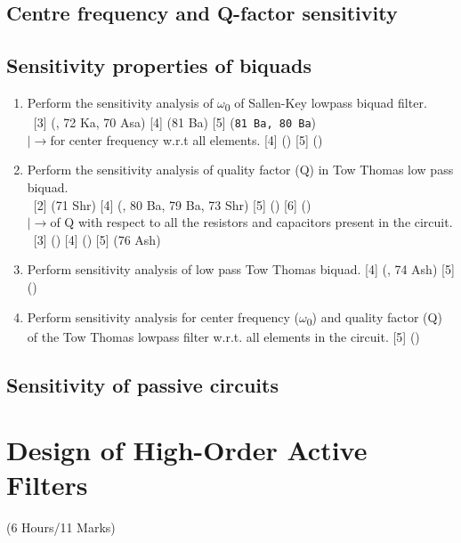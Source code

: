 \documentclass[12pt]{article}
\newcommand{\w}{\(\omega\)}
\newcommand{\lb}{\\$\left|\rightarrow\right.$}
\newcommand{\enter}{\\\textcolor{white}{1}}
\newcommand{\sub}[1]{\textsubscript{#1}}
\begin{document}
	\subsection{Centre frequency and Q-factor sensitivity}
	\subsection{Sensitivity properties of biquads}
		\begin{enumerate}
			\item Perform the sensitivity analysis of \w\sub{0} of Sallen-Key lowpass biquad filter.
			\enter\hfill [3] {\footnotesize (, 72 Ka, 70 Asa)} [4] {\footnotesize (81 Ba) } [5] {\footnotesize (\texttt{81 Ba, 80 Ba})}
			\lb for center frequency w.r.t all elements. \hfill [4] {\footnotesize ()} [5] {\footnotesize ()}

			\item Perform the sensitivity analysis of quality factor (Q) in Tow Thomas low pass biquad.
			\enter\hfill [2] {\footnotesize (71 Shr)} [4] {\footnotesize (, 80 Ba, 79 Ba, 73 Shr)} [5] {\footnotesize ()} [6] {\footnotesize ()}
			\lb of Q with respect to all the resistors and capacitors present in the circuit. 
			\enter\hfill[3] () [4] () [5] (76 Ash)

			\item Perform sensitivity analysis of low pass Tow Thomas biquad. \hfill [4] (, 74 Ash) [5] ()

			\item Perform sensitivity analysis for center frequency (\w\sub{0}) and quality factor (Q) of the Tow Thomas lowpass filter w.r.t. all elements in the circuit. \hfill [5] ()
		\end{enumerate}
	\subsection{Sensitivity of passive circuits}

	\pagebreak
	
\section{Design of High-Order Active Filters}
	\begin{center}(6 Hours/11 Marks)\end{center}
\end{document}
